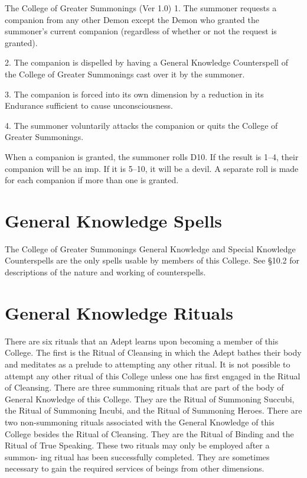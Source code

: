 \begin{Chapter}{The College of Greater Summonings (Ver 1.0)}
1.  The summoner requests a companion from any other Demon except the
Demon who granted the summoner’s current companion (regardless of
whether or not the request is granted).

2. The companion is dispelled by having a General Knowledge
Counterspell of the College of Greater Summonings cast over it by the
summoner.

3. The companion is forced into its own dimension by a reduction in
its Endurance sufficient to cause unconsciousness.

4.  The summoner voluntarily attacks the companion or quits the
College of Greater Summonings.

When a companion is granted, the summoner rolls D10.  If the result is
1–4, their companion will be an imp. If it is 5–10, it will be a
devil. A separate roll is made for each companion if more than one is
granted.

\section{General Knowledge Spells}

The College of Greater Summonings General Knowledge and Special
Knowledge Counterspells are the only spells usable by members of this
College.  See §10.2 for descriptions of the nature and working of
counterspells.

\section{General Knowledge Rituals}

There are six rituals that an Adept learns upon becoming a member of
this College. The first is the Ritual of Cleansing in which the Adept
bathes their body and meditates as a prelude to attempting any other
ritual.  It is not possible to attempt any other ritual of this
College unless one has first engaged in the Ritual of Cleansing.
There are three summoning rituals that are part of the body of General
Knowledge of this College. They are the Ritual of Summoning Succubi,
the Ritual of Summoning Incubi, and the Ritual of Summoning Heroes.
There are two non-summoning rituals associated with the General
Knowledge of this College besides the Ritual of Cleansing.  They are
the Ritual of Binding and the Ritual of True Speaking. These two
rituals may only be employed after a summon- ing ritual has been
successfully completed.  They are sometimes necessary to gain the
required services of beings from other dimensions.


\end{Chapter}
